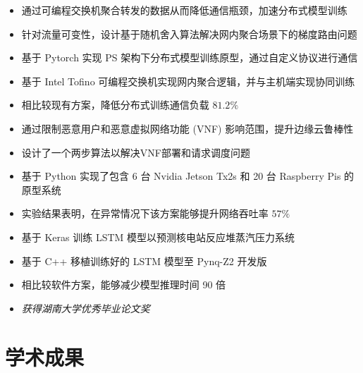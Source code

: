 \documentclass{resume}
\begin{document}
\begin{itemize}[parsep=0.5ex]
  \item 通过可编程交换机聚合转发的数据从而降低通信瓶颈，加速分布式模型训练
  \item 针对流量可变性，设计基于随机舍入算法解决网内聚合场景下的梯度路由问题
  \item 基于 Pytorch 实现 PS 架构下分布式模型训练原型，通过自定义协议进行通信
  \item 基于 Intel Tofino 可编程交换机实现网内聚合逻辑，并与主机端实现协同训练
  \item 相比较现有方案，降低分布式训练通信负载 $81.2\%$
\end{itemize}

\begin{itemize}[parsep=0.5ex]
  \item 通过限制恶意用户和恶意虚拟网络功能 (VNF) 影响范围，提升边缘云鲁棒性
  \item 设计了一个两步算法以解决VNF部署和请求调度问题
  \item 基于 Python 实现了包含 6 台 Nvidia Jetson Tx2s 和 20 台 Raspberry Pis 的原型系统
  \item 实验结果表明，在异常情况下该方案能够提升网络吞吐率 $57\%$
\end{itemize}

\begin{itemize}[parsep=0.5ex]
  \item 基于 Keras 训练 LSTM 模型以预测核电站反应堆蒸汽压力系统
  \item 基于 C++ 移植训练好的 LSTM 模型至 Pynq-Z2 开发版
  \item 相比较软件方案，能够减少模型推理时间 90 倍
  \item \textit{获得湖南大学优秀毕业论文奖}
\end{itemize}

\section{学术成果}
\end{document}
